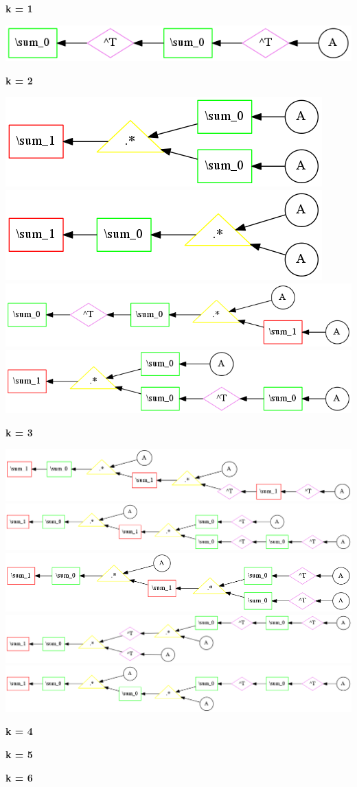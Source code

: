 {\bf k = 1}


\begin{center}
\includegraphics[width=0.45\linewidth]{trees/RBM_1_horizontal_0.png}
\end{center}


{\bf k = 2}


\begin{center}
\includegraphics[width=0.45\linewidth]{trees/RBM_2_horizontal_0.png}
\includegraphics[width=0.45\linewidth]{trees/RBM_2_horizontal_1.png}
\includegraphics[width=0.45\linewidth]{trees/RBM_2_horizontal_2.png}
\includegraphics[width=0.45\linewidth]{trees/RBM_2_horizontal_3.png}
\end{center}


{\bf k = 3}


\begin{center}
\includegraphics[width=0.45\linewidth]{trees/RBM_3_horizontal_0.png}
\includegraphics[width=0.45\linewidth]{trees/RBM_3_horizontal_1.png}
\includegraphics[width=0.45\linewidth]{trees/RBM_3_horizontal_2.png}
\includegraphics[width=0.45\linewidth]{trees/RBM_3_horizontal_3.png}
\includegraphics[width=0.45\linewidth]{trees/RBM_3_horizontal_4.png}
\end{center}


{\bf k = 4}




{\bf k = 5}




{\bf k = 6}


